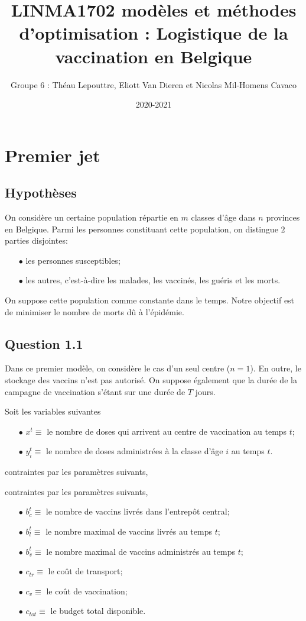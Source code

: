\documentclass[a4paper,11pt]{report}
\title{LINMA1702 modèles et méthodes d'optimisation : 
Logistique de la vaccination en Belgique
}
\author{Groupe 6 : Théau Lepouttre, Eliott Van Dieren et Nicolas Mil-Homens Cavaco}
\date{2020-2021}
\begin{document}
\maketitle
\section{Premier jet}

\subsection{Hypothèses}
On considère un certaine population répartie en $m$ classes d'âge dans $n$ provinces en Belgique.
Parmi les personnes constituant cette population, on distingue $2$ parties disjointes:   

\begin{itemize}
\item[$\bullet$]  les personnes susceptibles;
\item[$\bullet$]  les autres, c'est-à-dire les malades, les vaccinés, les guéris et les morts.
\end{itemize}

On suppose cette population comme constante dans le temps.
Notre objectif est de minimiser le nombre de morts dû à l'épidémie.

\subsection{Question 1.1}

Dans ce premier modèle, on considère le cas d'un seul centre ($n=1$).
En outre, le stockage des vaccins n'est pas autorisé.
On suppose également que la durée de la campagne de vaccination s'étant sur une durée de $T$ jours.

Soit les variables suivantes
\begin{itemize}
\item[$\bullet$] $x^t \equiv$ le nombre de doses qui arrivent au centre de vaccination au temps $t$; 
\item[$\bullet$] $y_i^t \equiv$ le nombre de doses administrées à la classe d'âge $i$ au temps $t$.
\end{itemize}

contraintes par les paramètres suivants,

contraintes par les paramètres suivants,

\begin{itemize}
\item[$\bullet$] $b_c^t \equiv$ le nombre de vaccins livrés dans l'entrepôt central;
\item[$\bullet$] $b_l^t \equiv$ le nombre maximal de vaccins livrés au temps $t$;
\item[$\bullet$] $b_v^t \equiv$ le nombre maximal de vaccins administrés au temps $t$;
\item[$\bullet$] $c_{tr} \equiv$ le coût de transport;
\item[$\bullet$] $c_v \equiv$ le coût de vaccination;
\item[$\bullet$] $c_{tot} \equiv$ le budget total disponible.
\end{itemize}
\end{document}
